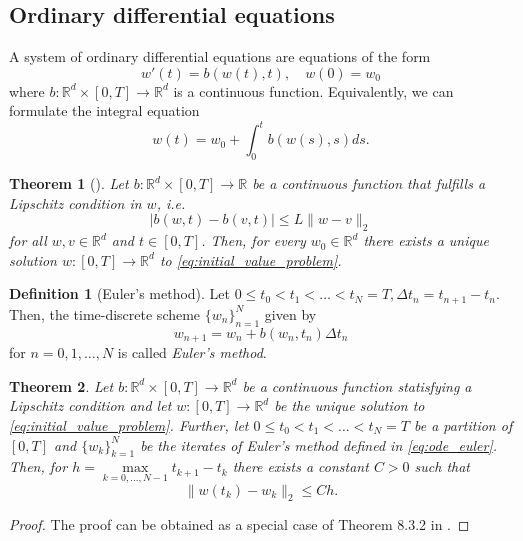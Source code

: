 \documentclass[12pt]{article}
\newtheorem{theorem}{Theorem}[section]
\theoremstyle{definition}
\newtheorem{definition}[definition]{Definition}
\numberwithin{equation}{section}
\newcommand{\R}{\mathbb{R}}
\newcommand{\norm}[1]{\lVert{#1}\rVert_2}
\begin{document}
\subsection{Ordinary differential equations}
A system of ordinary differential equations are equations of the form
\begin{equation}
  \label{eq:initial_value_problem}
  w'(t) = b(w(t),t), \quad w(0) = w_0
\end{equation}
where $b : \R^d \times [0,T] \rightarrow \R^d$ is a continuous function. Equivalently, we can formulate the integral equation
\begin{equation}
  w(t) = w_0 + \int_0^t b(w(s),s)ds.
\end{equation}
\begin{theorem}[]
  Let $b : \R^d \times [0,T] \rightarrow \R$ be a continuous function that fulfills a Lipschitz condition in $w$, i.e.
  \begin{equation*}
    \lvert b(w,t) - b(v,t) \rvert \leq L \norm{w - v}
  \end{equation*}
  for all $w,v \in \R^d$ and $t \in [0,T]$. Then, for every $w_0 \in \R^d$ there exists a unique solution $w:[0,T] \rightarrow \R^d$ to \eqref{eq:initial_value_problem}.
\end{theorem}
\begin{definition}[Euler's method]
  Let $0 \leq t_0 < t_1 < \dots < t_N = T, \Delta t_n = t_{n+1} - t_n$. Then, the time-discrete scheme $\{w_n\}_{n=1}^N$ given by
  \begin{equation}
    \label{eq:ode_euler}
    w_{n+1} = w_n + b(w_n, t_n) \Delta t_n
  \end{equation}
  for $n=0,1,\dots,N$ is called \emph{Euler's method}.
\end{definition}
\begin{theorem}
  \label{thm:euler_convergence}
  Let $b : \R^d \times [0,T] \rightarrow \R^d$ be a continuous function statisfying a Lipschitz condition and let $w:[0,T] \rightarrow \R^d$ be the unique solution to \eqref{eq:initial_value_problem}. Further, let $0 \leq t_0 < t_1 < \dots < t_N = T$ be a partition of $[0,T]$ and $\{w_k\}_{k=1}^N$ be the iterates of Euler's method defined in \eqref{eq:ode_euler}. Then, for $h = \max\limits_{k=0,\dots,N-1} t_{k+1} - t_k$ there exists a constant $C > 0$ such that
  \begin{equation*}
    \norm{w(t_k) - w_k} \leq C h.
  \end{equation*}
\end{theorem}
\begin{proof}
  The proof can be obtained as a special case of Theorem 8.3.2 in \cite[pp.~294]{kloedenNumericalSolutionStochastic2013}.
\end{proof}
\end{document}
